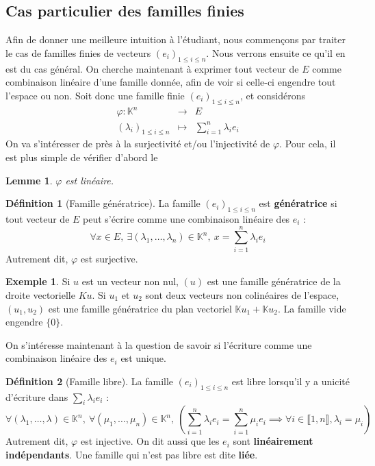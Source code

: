\documentclass[french]{book}
\newcommand{\K}{\mathbb{K}}
\theoremstyle{plain}
\newtheorem{lem}{Lemme}[chapter]
\theoremstyle{definition}
\newtheorem{dfn}{Définition}[chapter]
\newtheorem{exa}{Exemple}[chapter]
\theoremstyle{remark}
\begin{document}
\subsection{Cas particulier des familles finies}
Afin de donner une meilleure intuition à l'étudiant, nous commençons par traiter le cas de familles finies de vecteurs $(e_i)_{1 \leqslant i \leqslant n}$. Nous verrons ensuite ce qu'il en est du cas général. On cherche maintenant à exprimer tout vecteur de $E$ comme combinaison linéaire d'une famille donnée, afin de voir si celle-ci engendre tout l'espace ou non. Soit donc une famille finie $(e_i)_{1 \leqslant i \leqslant n}$, et considérons
$$\begin{array}{ccc}\varphi:\K^n&\rightarrow&E\\ (\lambda_i)_{1\leqslant i\leqslant n}&\mapsto&\displaystyle\sum_{i=1}^{n}\lambda_ie_i\end{array}$$
On va s'intéresser de près à la surjectivité et/ou l'injectivité de $\varphi$. Pour cela, il est plus simple de vérifier d'abord le
\begin{lem}
	$\varphi$ est linéaire.
\end{lem}
\begin{dfn}[Famille génératrice]
	La famille $(e_i)_{1 \leqslant i \leqslant n}$ est \textbf{génératrice} si tout vecteur de $E$ peut s'écrire comme une combinaison linéaire des $e_i$ : $$\forall x\in E,\ \exists(\lambda_1,\ldots,\lambda_n)\in\K^n,\ x=\sum_{i=1}^{n}\lambda_ie_i$$Autrement dit, $\varphi$ est surjective.
\end{dfn}
\begin{exa}
	Si $u$ est un vecteur non nul, $(u)$ est une famille génératrice de la droite vectorielle $Ku$. Si $u_1$ et $u_2$ sont deux vecteurs non colinéaires de l'espace, $(u_1, u_2)$ est une famille génératrice du plan vectoriel $\K u_1 + \K u_2$. La famille vide engendre $\{0\}$.
\end{exa}
On s'intéresse maintenant à la question de savoir si l'écriture comme une combinaison linéaire des $e_i$ est unique.
\begin{dfn}[Famille libre]
	La famille $(e_i)_{1 \leqslant i \leqslant n}$ est libre lorsqu'il y a unicité d'écriture dans $\displaystyle\sum_{i} \lambda_i e_i$ : $$\forall(\lambda_1,\ldots,\lambda)\in\K^n,\ \forall(\mu_1,\ldots,\mu_n)\in\K^n,\ \left(\sum_{i=1}^{n}\lambda_ie_i=\sum_{i=1}^{n}\mu_ie_i\implies \forall i\in\llbracket1,n\rrbracket, \lambda_i=\mu_i\right)$$	Autrement dit, $\varphi$ est injective. On dit aussi que les $e_i$ sont \textbf{linéairement indépendants}. Une famille qui n'est pas libre est dite \textbf{liée}.
\end{dfn}
\end{document}

